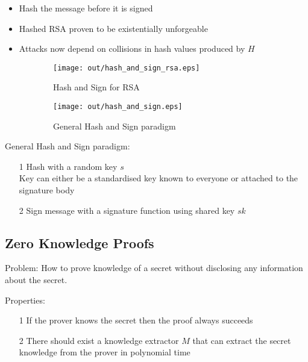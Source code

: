 \documentclass[a4paper]{article}
\begin{document}
\begin{itemize}
  \item Hash the message before it is signed
  \item Hashed RSA proven to be existentially unforgeable
  \item Attacks now depend on collisions in hash values produced by $H$
\end{itemize}

\begin{figure}[h]
  \centering
  \begin{subfigure}[t!]{0.45\textwidth}
    \centering
    \texttt{[image: out/hash\_and\_sign\_rsa.eps]}
    \caption{Hash and Sign for RSA}
    \label{fig:hash_and_sign_rsa}
  \end{subfigure}
  \begin{subfigure}[t!]{0.45\textwidth}
    \centering
    \texttt{[image: out/hash\_and\_sign.eps]}
    \caption{General Hash and Sign paradigm}
    \label{fig:hash_and_sign}
  \end{subfigure}
  \caption{}
  \label{fig:hash_and_sign_paradigm}
\end{figure}
\FloatBarrier

General Hash and Sign paradigm:
\begin{enumerate}
  \item[1]
    Hash with a random key $s$ \\
    Key can either be a standardised key known to everyone or attached to the
    signature body
  \item[2]
    Sign message with a signature function using shared key $sk$
\end{enumerate}

\subsection{Zero Knowledge Proofs}

Problem: How to prove knowledge of a secret without disclosing any information
about the secret.

Properties:
\begin{enumerate}
  \item[1] If the prover knows the secret then the proof always succeeds
  \item[2] There should exist a knowledge extractor $M$ that can extract the
           secret knowledge from the prover in polynomial time
\end{enumerate}
\end{document}
